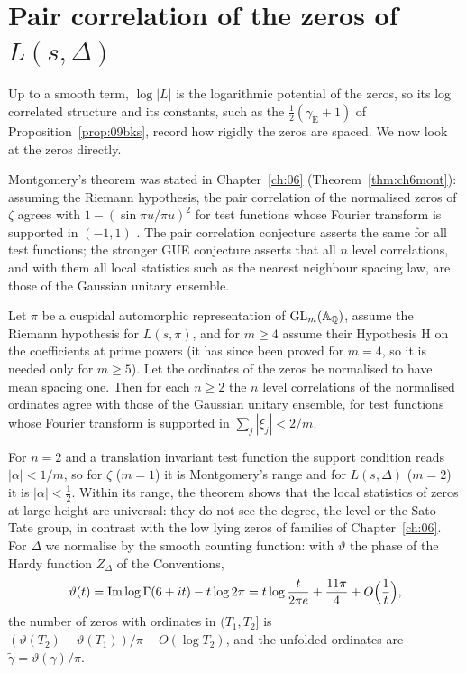 \section{Pair correlation of the zeros of $L(s,\Delta)$}\label{sec:09bpair}

Up to a smooth term, $\log|L|$ is the logarithmic potential of the zeros, so its log correlated structure and its constants, such as the $\frac12(\gamma_{\mathrm E}+1)$ of Proposition~\ref{prop:09bks}, record how rigidly the zeros are spaced. We now look at the zeros directly.

Montgomery's theorem was stated in Chapter~\ref{ch:06} (Theorem~\ref{thm:ch6mont}): assuming the Riemann hypothesis, the pair correlation of the normalised zeros of $\zeta$ agrees with $1-(\sin\pi u/\pi u)^2$ for test functions whose Fourier transform is supported in $(-1,1)$ \cite{montgomery1973}. The pair correlation conjecture asserts the same for all test functions; the stronger GUE conjecture asserts that all $n$ level correlations, and with them all local statistics such as the nearest neighbour spacing law, are those of the Gaussian unitary ensemble.

\begin{theorem}\label{thm:09brs}
Let $\pi$ be a cuspidal automorphic representation of $\mathrm{GL}_m(\mathbb{A}_{\mathbb{Q}})$, assume the Riemann hypothesis for $L(s,\pi)$, and for $m\ge4$ assume their Hypothesis H on the coefficients at prime powers (it has since been proved for $m=4$, so it is needed only for $m\ge5$). Let the ordinates of the zeros be normalised to have mean spacing one. Then for each $n\ge2$ the $n$ level correlations of the normalised ordinates agree with those of the Gaussian unitary ensemble, for test functions whose Fourier transform is supported in $\sum_j|\xi_j|<2/m$.
\end{theorem}

For $n=2$ and a translation invariant test function the support condition reads $|\alpha|<1/m$, so for $\zeta$ ($m=1$) it is Montgomery's range and for $L(s,\Delta)$ ($m=2$) it is $|\alpha|<\frac12$. Within its range, the theorem shows that the local statistics of zeros at large height are universal: they do not see the degree, the level or the Sato Tate group, in contrast with the low lying zeros of families of Chapter~\ref{ch:06}. For $\Delta$ we normalise by the smooth counting function: with $\vartheta$ the phase of the Hardy function $Z_\Delta$ of the Conventions,
\[
\vartheta(t)=\operatorname{Im}\log\Gamma(6+it)-t\log2\pi=t\log\frac{t}{2\pi e}+\frac{11\pi}{4}+O\Bigl(\frac1t\Bigr),
\]
the number of zeros with ordinates in $(T_1,T_2]$ is $(\vartheta(T_2)-\vartheta(T_1))/\pi+O(\log T_2)$, and the unfolded ordinates are $\tilde\gamma=\vartheta(\gamma)/\pi$.

